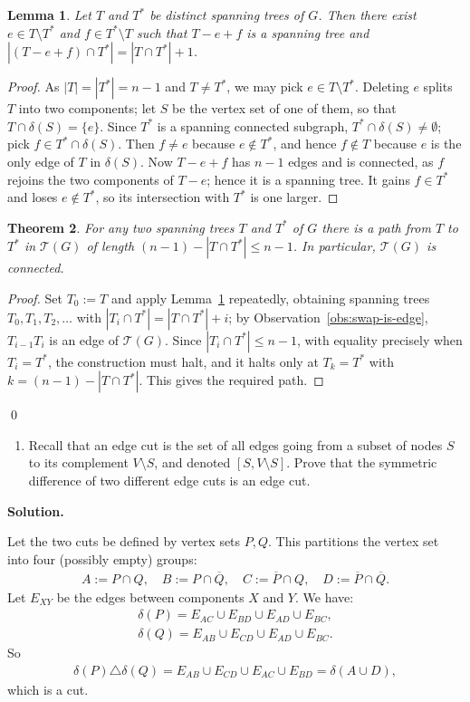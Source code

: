 \documentclass[11pt,letterpaper]{article}
\newtheorem{theorem}{Theorem}[section]
\newtheorem{lemma}[theorem]{Lemma}
\theoremstyle{definition}
\newcommand{\calT}{\mathcal{T}}
\newcommand{\solution}{\medskip\noindent\textbf{Solution.}\par\medskip}
\begin{document}
\begin{lemma}\label{lem:exchange}
    Let $T$ and $T^*$ be distinct spanning trees of $G$.
    Then there exist $e\in T\setminus T^*$ and $f\in T^*\setminus T$ such that $T-e+f$ is a spanning tree and $|(T-e+f)\cap T^*| = |T\cap T^*|+1$.
\end{lemma}
\begin{proof}
    As $|T|=|T^*|=n-1$ and $T\neq T^*$, we may pick $e\in T\setminus T^*$.
    Deleting $e$ splits $T$ into two components; let $S$ be the vertex set of one of them, so that $T\cap\delta(S)=\{e\}$.
    Since $T^*$ is a spanning connected subgraph, $T^*\cap\delta(S)\neq\emptyset$; pick $f\in T^*\cap\delta(S)$.
    Then $f\neq e$ because $e\notin T^*$, and hence $f\notin T$ because $e$ is the only edge of $T$ in $\delta(S)$.
    Now $T-e+f$ has $n-1$ edges and is connected, as $f$ rejoins the two components of $T-e$; hence it is a spanning tree.
    It gains $f\in T^*$ and loses $e\notin T^*$, so its intersection with $T^*$ is one larger.
\end{proof}

\begin{theorem}
    For any two spanning trees $T$ and $T^*$ of $G$ there is a path from $T$ to $T^*$ in $\calT(G)$ of length $(n-1)-|T\cap T^*| \leq n-1$.
    In particular, $\calT(G)$ is connected.
\end{theorem}
\begin{proof}
    Set $T_0:=T$ and apply Lemma~\ref{lem:exchange} repeatedly, obtaining spanning trees $T_0,T_1,T_2,\ldots$ with $|T_i\cap T^*| = |T\cap T^*| + i$; by Observation~\ref{obs:swap-is-edge}, $T_{i-1}T_i$ is an edge of $\calT(G)$.
    Since $|T_i\cap T^*|\leq n-1$, with equality precisely when $T_i=T^*$, the construction must halt, and it halts only at $T_k=T^*$ with $k=(n-1)-|T\cap T^*|$.
    This gives the required path.
\end{proof}
\qed

\begin{enumerate}[resume=q]
\item Recall that an edge cut is the set of all edges going from a subset of nodes $S$ to its complement $V \setminus S$, and denoted $[S, V \setminus S]$. Prove that the symmetric difference of two different edge cuts is an edge cut.
\end{enumerate}

\solution
Let the two cuts be defined by vertex sets $P,Q$. 
This partitions the vertex set into four (possibly empty) groups:
\begin{align*}
    A:= P\cap Q, \quad B:=P\cap \overline{Q}, \quad C:=\overline{P}\cap Q, \quad D:=\overline{P}\cap \overline{Q}.
\end{align*}
Let $E_{XY}$ be the edges between components $X$ and $Y$. We have:
\begin{align*}
    \delta(P) = E_{AC} \cup E_{BD}\cup E_{AD}\cup E_{BC}, \\
    \delta(Q) = E_{AB} \cup E_{CD}\cup E_{AD}\cup E_{BC}. 
\end{align*}
So 
\begin{align*}
    \delta(P) \triangle \delta(Q) = E_{AB} \cup E_{CD} \cup E_{AC} \cup E_{BD} = \delta(A\cup D),
\end{align*}
which is a cut.
\end{document}
